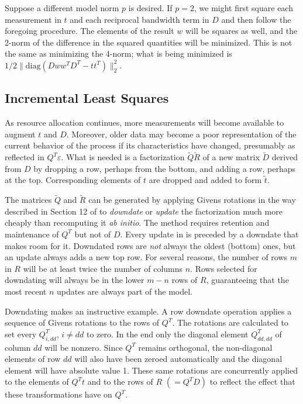 Suppose a different model norm $p$ is desired.  If $p = 2$, we might first square each measurement in $t$
and each reciprocal bandwidth term in $D$ and then follow the foregoing procedure.
The elements of the result $w$ will be squares as well, and the 2-norm of the difference in the squared quantities will be minimized.  This is not the same as minimizing the 4-norm; what is being minimized is $1/2\|\mbox{diag}(Dww^TD^T - tt^T)\|^2_2$.

\subsection*{Incremental Least Squares}

As resource allocation continues, more measurements will become available to augment $t$ and $D$.
Moreover, older data may become a poor representation of the current behavior of the process if its characteristics have changed,
presumably as reflected in $Q^T\varepsilon$.
What is needed is a factorization $\tilde{Q}\tilde{R}$ of a new matrix $\tilde{D}$
derived from $D$ by dropping a row, perhaps from the bottom,
and adding a row, perhaps at the top.
Corresponding elements of $t$ are dropped and added to form $\tilde{t}$.

The matrices $\tilde{Q}$ and $\tilde{R}$ can be generated by applying Givens rotations
in the way described in Section 12 of \cite{GoVL} to \emph{downdate} or \emph{update} the factorization
much more cheaply than recomputing it \emph{ab initio}.
The method requires retention and maintenance of $Q^T$ but not of $D$.
Every update in \pacora is preceded by a downdate that makes room for it.
Downdated rows are \emph{not} always the oldest (bottom) ones, but
an update always adds a new top row.
For several reasons, the number of rows $m$ in $R$
will be at least twice the number of columns $n$.
Rows selected for downdating will always be in the lower $m - n$ rows of $R$,
guaranteeing that the most recent $n$ updates are always part of the model.

Downdating makes an instructive example. A row downdate operation applies
a sequence of Givens rotations to the rows of $Q^T$.
The rotations are calculated to set every $Q^T_{i,dd}$, $i \neq dd$ to zero.
In the end only the diagonal element $Q^T_{dd,dd}$ of column $dd$ will be nonzero.
Since $Q^T$ remains orthogonal, the non-diagonal elements of row $dd$ will also have been zeroed automatically
and the diagonal element will have absolute value 1.
These same rotations are concurrently applied to the elements of $Q^T t$ and to the rows of $R$ $(= Q^T D)$
to reflect the effect that these transformations have on $Q^T$.

